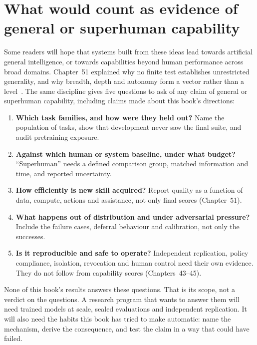 \section*{What would count as evidence of general or superhuman capability}
Some readers will hope that systems built from these ideas lead towards artificial
general intelligence, or towards capabilities beyond human performance across broad
domains. Chapter~51 explained why no finite test establishes unrestricted generality,
and why breadth, depth and autonomy form a vector rather than a
level~\cite{evod51:levels}. The same discipline gives five questions to ask of any claim
of general or superhuman capability, including claims made about this book's
directions:
\begin{enumerate}
\setlength{\itemsep}{1pt}
\item \textbf{Which task families, and how were they held out?} Name the population of
tasks, show that development never saw the final suite, and audit pretraining exposure.
\item \textbf{Against which human or system baseline, under what budget?}
``Superhuman'' needs a defined comparison group, matched information and time, and
reported uncertainty.
\item \textbf{How efficiently is new skill acquired?} Report quality as a function of
data, compute, actions and assistance, not only final scores (Chapter~51).
\item \textbf{What happens out of distribution and under adversarial pressure?}
Include the failure cases, deferral behaviour and calibration, not only the successes.
\item \textbf{Is it reproducible and safe to operate?} Independent replication, policy
compliance, isolation, revocation and human control need their own evidence. They do
not follow from capability scores (Chapters~43--45).
\end{enumerate}
None of this book's results answers these questions. That is its scope, not a verdict
on the questions. A research program that wants to answer them will need trained
models at scale, sealed evaluations and independent replication. It will also need the
habits this book has tried to make automatic: name the mechanism, derive the
consequence, and test the claim in a way that could have failed.

